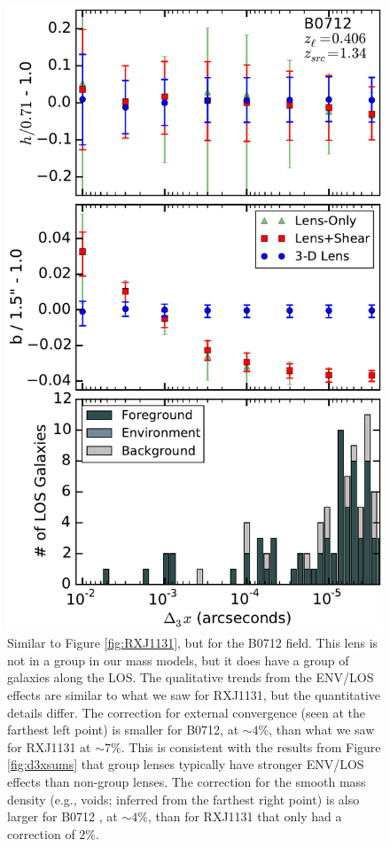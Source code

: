 \documentclass{emulateapj}
\begin{document}
\begin{figure}[t]
\begin{center}
\includegraphics[width=\columnwidth]{new_B0712_reallos.pdf}
\caption{\label{fig:B0712} Similar to Figure \ref{fig:RXJ1131}, but for the B0712 field.  This lens is not in a group in our mass models, but it does have a group of galaxies along the LOS.  The qualitative trends from the ENV/LOS effects are similar to what we saw for RXJ1131, but the quantitative details differ. The correction for external convergence (seen at the farthest left point) is smaller for B0712, at $\sim 4\%$, than what we saw for RXJ1131 at $\sim 7\%$. This is consistent with the results from Figure \ref{fig:d3xsums} that group lenses typically have stronger ENV/LOS effects than non-group lenses. The correction for the smooth mass density (e.g., voids; inferred from the farthest right point) is also larger for B0712 , at $\sim 4\%$, than for RXJ1131 that only had a correction of $2 \%$.
}
\end{center}
\end{figure}
\end{document}
